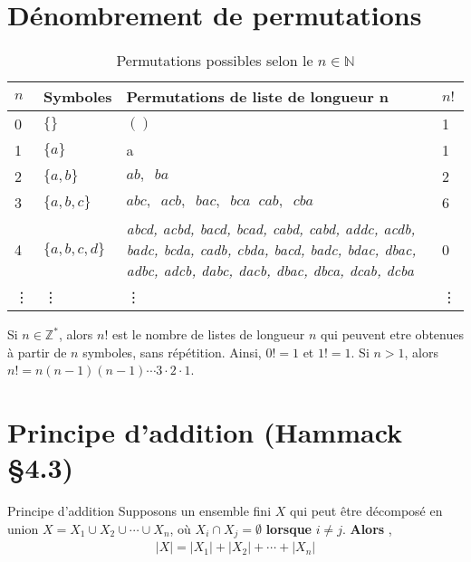 \documentclass[8pt]{report}
\begin{document}
\begin{multicols*}{2}
\section{Dénombrement de permutations}

\begin{table}[h]
  \caption {Permutations possibles selon le $n \in \mathbb{N}$ }

  \begin{center}
    \renewcommand{\arraystretch}{1.5}
    \selectfont
    \footnotesize
    \begin{tabular}{l|l|p{10cm}|l}
    \arrayrulecolor{blue}\hline
    \rowcolor{lightBlue}
    \textcolor{myb}{$n$} & \textcolor{myb}{Symboles} & \textcolor{myb}{Permutations de liste de longueur n} & \textcolor{myb}{$n!$}
    \\
    \hline
    \hline
    \arrayrulecolor{black}
    0 & $\{ \}$ & $()$  & 1  

    \\
    \hline
    1 & $\{a\}$ & a & 1 
    \\
    \hline

    2 & $\{a, b\}$ & $ab,\;\; ba$ & 2 
    \\
    \hline
    3 & $\{a, b, c\}$  & $abc,\;\; acb,\;\; bac,\;\; bca \;\; cab, \;\; cba$ & 6 
    \\
    \hline 
    4 & $\{ a, b, c, d\}$ &  \textit{abcd, \;\; acbd, \;\; bacd, \;\; bcad, \;\; cabd, \;\;cabd,    
              addc, \;\; acdb, \;\; badc, \;\; bcda, \;\; cadb, \;\; cbda,   
              bacd, \;\; badc, \;\; bdac, \;\; dbac, \;\; adbc, \;\; adcb,   
    dabc, \;\; dacb, \;\; dbac, \;\; dbca, \;\; dcab, \;\; dcba}  & 0 
    \\ 
    \hline 
    \vdots & \vdots & \vdots & \vdots 
    \\
    \hline 
\end{tabular}
\end{center}
\end{table}

\begin{Definitionx*}{}{}
  Si $n \in \mathbb{Z}^*$, alors $n!$ est le nombre de listes de longueur $n$ qui peuvent etre obtenues à partir de $n$ 
  symboles, sans répétition.  Ainsi, $0! = 1$ et $1! = 1$. Si $n > 1$, alors 
  $n! = n\left(n-1\right) \left(n-1\right)\cdots 3 \cdot 2 \cdot 1$.
\end{Definitionx*}

\section{Principe d'addition (Hammack \S 4.3)}
\begin{Definitionx*}{Principe d'addition}{}
  Supposons un ensemble fini $X$ qui peut être décomposé en union
  $X = X_1 \cup X_2 \cup \cdots \cup X_n$, où $X_i \cap X_j = \emptyset$ \textbf{lorsque}
  $i \neq j$. \textbf{Alors}  , 
  \begin{align*}
              |X| = |X_1| + |X_2| +\cdots+ |X_n|
  \end{align*}
\end{Definitionx*}


\end{multicols*}
\end{document}
